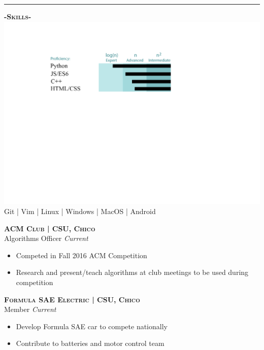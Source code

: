 \documentclass[12pt]{article}
\begin{document}
\noindent\rule{19cm}{0.4pt}
\bigskip
\begin{multicols}{2}
\begin{center}
\textbf{\textsc{-Skills-}}
\includegraphics[trim={2.8cm 7cm 2cm 2cm},clip]{ResumePic}
\smallskip
\footnotesize
\color{gray}Git | Vim | Linux | Windows | MacOS | Android
\end{center}
\columnbreak
\center
\footnotesize
\color{black}\textsc{\textbf{ACM Club | CSU, Chico}}\\

\color{Cerulean}Algorithms Officer \hfill \color{gray}\textit{Current}\\
\begin{itemize}
\setlength{\itemsep}{0pt}
	\item Competed in Fall 2016 ACM Competition
	\item Research and present/teach algorithms at club meetings to be used during competition
\end{itemize}

\center
\color{black}\textsc{\textbf{Formula SAE Electric | CSU, Chico}}\\
\color{Cerulean}Member \hfill \color{gray}\textit{Current}

\begin{itemize}
\setlength{\itemsep}{0pt}
	\item Develop Formula SAE car to compete nationally
	\item Contribute to batteries and motor control team
\end{itemize}


\end{multicols}
\end{document}
